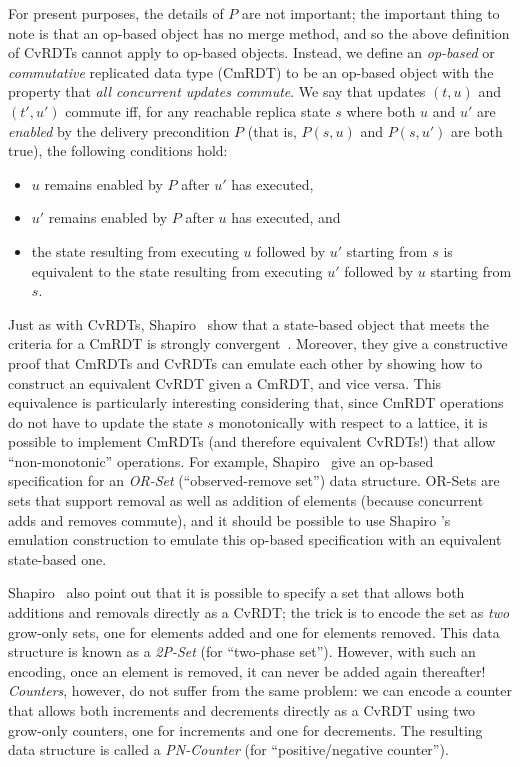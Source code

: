 \documentclass{article}
\begin{document}
For present purposes, the details of $P$ are not important; the
important thing to note is that an op-based object has no merge
method, and so the above definition of CvRDTs cannot apply to op-based
objects.  Instead, we define an \emph{op-based} or \emph{commutative}
replicated data type (CmRDT) to be an op-based object with the
property that \emph{all concurrent updates commute}.  We say that
updates $(t, u)$ and $(t', u')$ commute iff, for any reachable replica
state $s$ where both $u$ and $u'$ are \emph{enabled} by the delivery
precondition $P$ (that is, $P(s, u)$ and $P(s, u')$ are both true),
the following conditions hold:
\begin{itemize}
  \item $u$ remains enabled by $P$ after $u'$ has executed,
  \item $u'$ remains enabled by $P$ after $u$ has executed, and
  \item the state resulting from executing $u$ followed by $u'$
    starting from $s$ is equivalent to the state resulting from
    executing $u'$ followed by $u$ starting from $s$.
\end{itemize}
Just as with CvRDTs, Shapiro \etal~show that a state-based object that
meets the criteria for a CmRDT is strongly convergent~\cite{crdts}.
Moreover, they give a constructive proof that CmRDTs and CvRDTs can
emulate each other by showing how to construct an equivalent CvRDT
given a CmRDT, and vice versa.  This equivalence is particularly
interesting considering that, since CmRDT operations do not have to
update the state $s$ monotonically with respect to a lattice, it is
possible to implement CmRDTs (and therefore equivalent CvRDTs!) that
allow ``non-monotonic'' operations.  For example, Shapiro \etal~give
an op-based specification for an \emph{OR-Set} (``observed-remove
set'') data structure.  OR-Sets are sets that support removal as well
as addition of elements (because concurrent adds and removes commute),
and it should be possible to use Shapiro \etal's emulation
construction to emulate this op-based specification with an equivalent
state-based one.

Shapiro \etal~also point out that it is possible to specify a set that
allows both additions and removals directly as a CvRDT; the trick is
to encode the set as \emph{two} grow-only sets, one for elements added
and one for elements removed.  This data structure is known as a
\emph{2P-Set} (for ``two-phase set'').  However, with such an
encoding, once an element is removed, it can never be added again
thereafter!  \emph{Counters}, however, do not suffer from the same
problem: we can encode a counter that allows both increments and
decrements directly as a CvRDT using two grow-only counters, one for
increments and one for decrements. The resulting data structure is
called a \emph{PN-Counter} (for ``positive/negative counter'').
\end{document}
